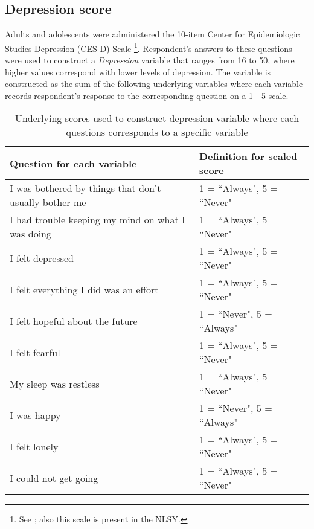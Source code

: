 \subsection{Depression score}
Adults and adolescents were administered the 10-item Center for Epidemiologic Studies Depression (CES-D) Scale \footnote{See \cite{Radloff_1977_APM}; also this scale is present in the NLSY.}. Respondent's answers to these questions were used to construct a \textit{Depression} variable that ranges from 16 to 50, where higher values correspond with lower levels of depression. The variable is constructed as the sum of the following underlying variables where each variable records respondent's response to the corresponding question on a 1 - 5 scale. \\

\begin{table}[H]
\begin{center}
\footnotesize{
\caption{Underlying scores used to construct depression variable where each questions corresponds to a specific variable}
	\begin{tabular}{L{8.5cm} l}
	\hline
	\textbf{Question for each variable}	 					& \textbf{Definition for scaled score} \\
	\hline
	I was bothered by things that don’t usually bother me	& 1 = ``Always", 5 = ``Never"  \\	
	I had trouble keeping my mind on what I was doing	& 1 = ``Always", 5 = ``Never"  	\\
	I felt depressed											& 1 = ``Always", 5 = ``Never"	 \\
	I felt everything I did was an effort						& 1 = ``Always", 5 = ``Never"	 \\
	I felt hopeful about the future							& 1 = ``Never",  5 = ``Always"	 \\
	I felt fearful 												& 1 = ``Always", 5 = ``Never"	\\ 
	My sleep was restless										& 1 = ``Always", 5 = ``Never" \\
	I was happy												& 1 = ``Never", 5 = ``Always" \\
	I felt lonely												& 1 = ``Always", 5 = ``Never"  \\
	I could not get going 										& 1 = ``Always",  5 = ``Never" \\
	
	\hline
	
	\end{tabular}
}

\end{center}
\end{table}
\clearpage

